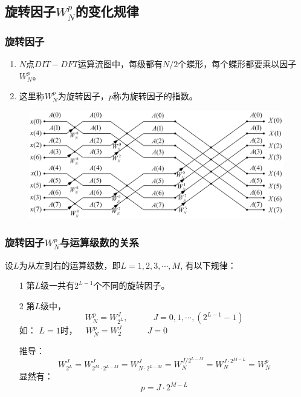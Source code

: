 \documentclass[notheorems,compress,mathserif,table]{beamer}
\begin{document}
\subsection{旋转因子$W_N^p$的变化规律}
\begin{frame}[shrink]\frametitle{旋转因子}
\begin{enumerate}
  \item $N$点$DIT-DFT$运算流图中，每级都有$N/2$个蝶形，每个蝶形都要乘以因子$W_N^p$。
  \item 这里称$W_N^p$为旋转因子，$p$称为旋转因子的指数。
\end{enumerate}

\begin{figure}[h]
  \centering
  \includegraphics[width=0.99\textwidth]{8dftThird.jpg}
\end{figure}
\end{frame}
\begin{frame}\frametitle{旋转因子$W_N^p$与运算级数的关系}%
%
设$L$为从左到右的运算级数，即$L=1,2,3,\cdots,M$,
有以下规律：
\pause
\begin{enumerate}
  \item [1] 第$L$级一共有$2^{L-1}$个不同的旋转因子。
  \item [2] 第$L$级中，
        $$W_N^p=W_{2^L}^{J},\quad\quad\quad J=0,1,\cdots,(2^{L-1}-1)$$
        \pause 如： $L=1$时，$\quad W_N^p=W_2^J\quad\quad\quad J=0$
        \par 推导：
        $$W_{2^L}^{J} = W_{2^M\cdot2^{L-M}}^{J} = W_{N\cdot2^{L-M}}^{J} = W_{N}^{J/2^{L-M}} = W_{N}^{J\cdot 2^{M-L}} =W_N^p$$
        \pause 显然有：
        $$p=J\cdot 2^{M-L}$$
\end{enumerate}
\end{frame}
\end{document}
